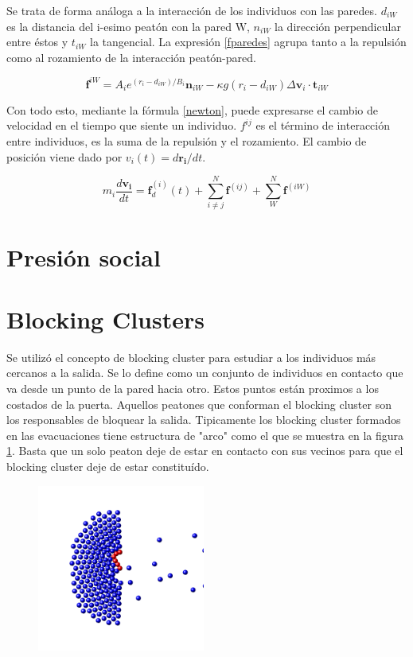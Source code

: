 Se trata de forma análoga a la interacción de los individuos con las paredes. $d_{iW}$ es la distancia del i-esimo peatón con la pared W, $n_{iW}$ la dirección perpendicular entre éstos y $t_{iW}$ la tangencial. La expresión \ref{fparedes} agrupa tanto a la repulsión como al rozamiento de la interacción peatón-pared.

\begin{equation}
\mathbf{f}^{iW}=A_ie^{(r_{i}-d_{iW})/B_i}\mathbf{n}_{iW}-\kappa g(r_{i}-d_{iW})\Delta \mathbf{v}_{i}\cdot\mathbf{t}_{iW}
\label{fparedes}
\end{equation} 

Con todo esto, mediante la fórmula \ref{newton}, puede expresarse el cambio de velocidad en el tiempo que siente un individuo. $f^{ij}$ es el término de interacción entre individuos, es la suma de la repulsión y el rozamiento. El cambio de posición viene dado por $v_{i}(t)=d\mathbf{r_i}/dt$.

\begin{equation}
m_i\frac{d\mathbf{v_i}}{dt}=\mathbf{f}_d^ {(i)}(t)+ \sum_{i\neq j}^{N}\mathbf{f}^{(ij)} + \sum_{W}^{N}\mathbf{f}^{(iW)}
\label{newton}
\end{equation}  
 
\section{Presión social}

\section{Blocking Clusters}

Se utilizó el concepto de blocking cluster para estudiar a los individuos más cercanos a la salida. Se lo define como un conjunto de individuos en contacto que va desde un punto de la pared hacia otro. Estos puntos están proximos a los costados de la puerta. Aquellos peatones que conforman el blocking cluster son los responsables de bloquear la salida.  Tipicamente los blocking cluster formados en las evacuaciones tiene estructura de "arco" como el que se muestra en la figura \ref{bc}. Basta que un solo peaton deje de estar en contacto con sus vecinos para que el blocking cluster deje de estar constituído. \\

\begin{figure}[H]
    \centering
    \includegraphics[height=5.5cm]{figuras/in_image_2_120000_bkg.png}
    \caption[width=5cm]{}
    \label{bc}
\end{figure}

